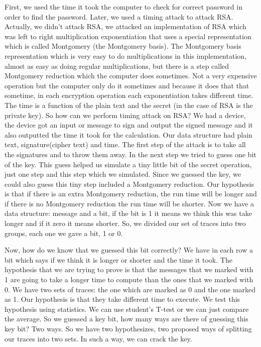 First, we used the time it took the computer to check for correct password in order to find the password. Later, we used a timing attack to attack RSA. Actually, we didn't attack RSA, we attacked an implementation of RSA which was left to right multiplication exponentiation that uses a special representation which is called Montgomery (the Montgomery basis). The Montgomery basis representation which is very easy to do multiplications in this implementation, almost as easy as doing regular multiplications, but there is a step called Montgomery reduction which the computer does sometimes. Not a very expensive operation but the computer only do it sometimes and because it does that that sometime, in each encryption operation each exponentiation takes different time. The time is a function of the plain text and the secret (in the case of RSA is the private key). So how can we perform timing attack on RSA? We had a device, the device got an input or message to sign and output the signed message and it also outputted the time it took for the calculation. Our data structure had plain text, signature(cipher text) and time.  The first step of the attack is to take all the signatures and to throw them away. In the next step we tried to guess one bit of the key. This guess helped us simulate a tiny little bit of the secret operation, just one step and this step which we simulated. Since we guessed the key, we could also guess this tiny step included a Montgomery reduction. Our hypothesis is that if there is an extra Montgomery reduction, the run time will be longer and if there is no Montgomery reduction the run time will be shorter. Now we have a data structure: message and a bit, if the bit is 1 it means we think this was take longer and if it zero it means shorter. So, we divided our set of traces into two groups, each one we gave a bit, 1 or 0. 

Now, how do we know that we guessed this bit correctly? We have in each row a bit which says if we think it is longer or shorter and the time it took. The hypothesis that we are trying to prove is that the messages that we marked with 1 are going to take a longer time to compute than the ones that we marked with 0. We have two sets of traces: the one which are marked as 0 and the one marked as 1. Our hypothesis is that they take different time to execute. We test this hypothesis using statistics. We can use student's T-test or we can just compare the average. So we guessed a key bit, how many ways are there of guessing this key bit? Two ways. So we have two hypothesizes, two proposed ways of splitting our traces into two sets. In such a way, we can crack the key.

